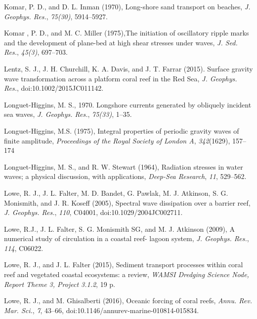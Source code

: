 \documentclass[default,jgrga]{agutex2015}
\begin{document}
\begin{article}
\begin{thebibliography}{}
Komar, P. D., and D. L. Inman (1970), Long-shore sand transport on beaches, \textit{J. Geophys. Res.}, \textit{75(30)}, 5914--5927.

Komar , P. D., and M. C. Miller (1975),The initiation of oscillatory ripple marks and the development of plane-bed at high shear stresses under waves, \textit{J. Sed. Res.}, \textit{45(3)}, 697--703.

Lentz, S. J., J. H. Churchill, K. A. Davis, and J. T. Farrar (2015). Surface gravity wave transformation across a platform coral reef in the Red Sea, \textit{J. Geophys. Res.}, doi:10.1002/2015JC011142.

Longuet-Higgins, M. S., 1970. Longshore currents generated by obliquely incident sea waves, \textit{J. Geophys. Res.}, \textit{75(33)}, 1--35.

Longuet-Higgins, M.S. (1975), Integral properties of periodic gravity waves of finite amplitude, \textit{Proceedings of the Royal Society of London A}, \textit{342}(1629), 157--174

Longuet-Higgins, M. S., and R. W. Stewart (1964), Radiation stresses in water waves; a physical discussion, with applications, \textit{Deep-Sea Research}, \textit{11}, 529--562.

Lowe, R. J., J. L. Falter, M. D. Bandet, G. Pawlak, M. J. Atkinson, S. G. Monismith, and J. R. Koseff (2005), Spectral wave dissipation over a barrier reef, \textit{J. Geophys. Res.}, \textit{110}, C04001, doi:10.1029/2004JC002711.

Lowe, R.J., J. L. Falter, S. G. Monismith SG, and M. J. Atkinson (2009), A numerical study of circulation in a coastal reef-
lagoon system, \textit{J. Geophys. Res.}, \textit{114}, C06022.

Lowe, R. J., and J. L. Falter (2015), Sediment transport processes within coral reef and vegetated coastal ecosystems: a review, \textit{WAMSI Dredging Science Node, Report Theme 3, Project 3.1.2}, 19 p.

Lowe, R. J., and M. Ghisalberti (2016), Oceanic forcing of coral reefs, \textit{Annu. Rev. Mar. Sci.}, \textit{7}, 43--66, doi:10.1146/annurev-marine-010814-015834.


\end{thebibliography}
\end{article}
\end{document}
